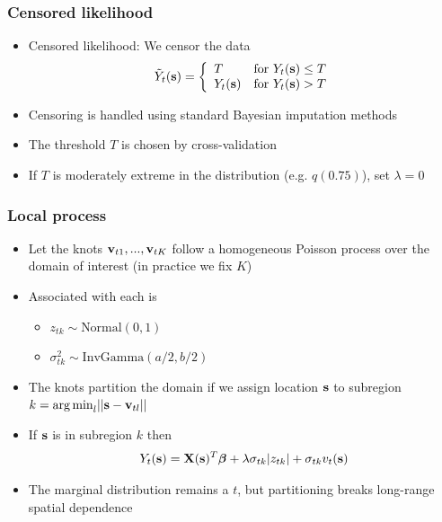 \documentclass{beamer}
\begin{document}
 \begin{frame}\frametitle{Censored likelihood}
 	\begin{itemize}\setlength\itemsep{\fill}
 	\item Censored likelihood: We censor the data
 	$${\tilde Y}_t(\mathbf{s}) =\left\{\begin{array}{ll}
 	T & \text{for } Y_t(\mathbf{s})\le T\\
 	Y_t(\mathbf{s}) & \text{for } Y_t(\mathbf{s})>T
 	\end{array}\right.$$
 	\item Censoring is handled using standard Bayesian imputation methods
 	\item The threshold $T$ is chosen by cross-validation
 	\item If $T$ is moderately extreme in the distribution (e.g. $q(0.75)$), set $\lambda = 0$
 	\end{itemize}
 \end{frame}

 \begin{frame}\frametitle{Local \skewt{} process}
 	\begin{itemize}\setlength\itemsep{\fill}
 	\item Let the knots $\mathbf{v}_{t1},...,\mathbf{v}_{tK}$ follow a homogeneous Poisson process over the domain of interest (in practice we fix $K$)
 	\item Associated with each is
 	\begin{itemize}
 		\item $z_{tk}\sim\mbox{Normal}(0,1)$
 		\item $\sigma_{tk}^2\sim\mbox{InvGamma}(a/2,b/2)$
 	\end{itemize}
 	\item The knots partition the domain if we assign location $\mathbf{s}$ to subregion $k={\mathop{\rm arg\, min}}_{l}||\mathbf{s}-\mathbf{v}_{tl}||$
 	\item If $\mathbf{s}$ is in subregion $k$ then $$Y_t(\mathbf{s}) = \mathbf{X}(\mathbf{s})^T\mbox{\boldmath $\beta$} +\lambda\sigma_{tk}|z_{tk}| + \sigma_{tk}v_t(\mathbf{s})\nonumber$$
 	\item The marginal distribution remains a $t$, but partitioning breaks long-range spatial dependence
 	\end{itemize}
 \end{frame}
\end{document}
